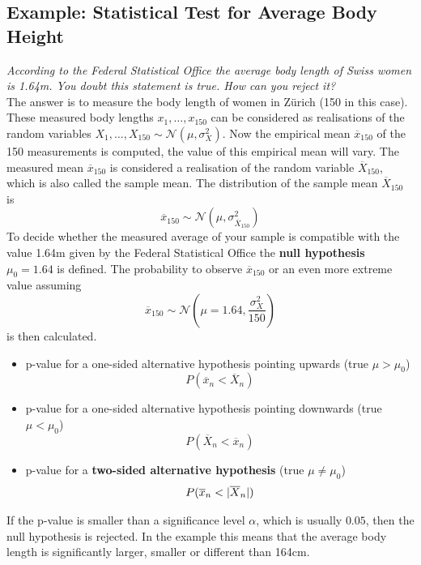 \documentclass[11pt]{article}
\theoremstyle{definition}
\newcommand*\samplemean[1]{\overline{#1}}
\newcommand*\N[1]{\mathcal{N}\left(#1\right)}
\DeclarePairedDelimiter\abs{\lvert}{\rvert}
\begin{document}
\subsection{Example: Statistical Test for Average Body Height}
\textit{According to the Federal Statistical Office the average body length of Swiss women is 1.64m. You doubt this statement is true. How can you reject it?}\\

\vspace{1em}
\noindent
The answer is to measure the body length of women in Zürich (150 in this case). These measured body lengths $x_1,\dots,x_{150}$ can be considered as realisations of the random variables $X_1,\dots,X_{150} \sim \N{\mu, \sigma_X^2}$. Now the empirical mean $\samplemean{x}_{150}$ of the 150 measurements is computed, the value of this empirical mean will vary. The measured mean $\samplemean{x}_{150}$ is considered a realisation of the random variable $\samplemean{X}_{150}$, which is also called the sample mean. The distribution of the sample mean $\samplemean{X}_{150}$ is
\begin{equation*}
	\samplemean{x}_{150} \sim \N{\mu, \sigma_{\samplemean{X}_150}^2}
\end{equation*}
To decide whether the measured average of your sample is compatible with the value 1.64m given by the Federal Statistical Office the \textbf{null hypothesis} $\mu_0 = 1.64$ is defined. The probability to observe $\samplemean{x}_{150}$ or an even more extreme value assuming
\begin{equation*}
	\samplemean{x}_{150} \sim \N{\mu=1.64, \frac{\sigma_X^2}{150}}
\end{equation*}
is then calculated.
\begin{itemize}
	\item p-value for a one-sided alternative hypothesis pointing upwards (true $\mu > \mu_0$)
	\begin{equation*}
		P(\samplemean{x}_{n} < \samplemean{X}_{n})
	\end{equation*}
	\item p-value for a one-sided alternative hypothesis pointing downwards (true $\mu < \mu_0$)
	\begin{equation*}
		P(\samplemean{X}_{n} < \samplemean{x}_{n})
	\end{equation*}
	\item p-value for a \textbf{two-sided alternative hypothesis} (true $\mu \neq \mu_0$)
	\begin{equation*}
		P(\samplemean{x}_{n} < \abs{\samplemean{X}_{n}})
	\end{equation*}
\end{itemize}
If the p-value is smaller than a significance level $\alpha$, which is usually $0.05$, then the null hypothesis is rejected. In the example this means that the average body length is significantly larger, smaller or different than 164cm.
\end{document}
